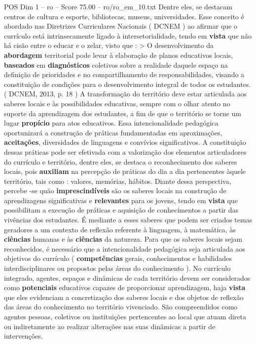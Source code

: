 \begin{textsample}{POS Dim 1 – ro – Score 75.00 – ro/ro\_em\_10.txt}
Dentre eles, se destacam centros de cultura e esporte, bibliotecas, museus, universidades.
Esse conceito é abordado nas Diretrizes Curriculares Nacionais ( DCNEM ) ao afirmar que o currículo está intrinsecamente ligado à intersetorialidade, tendo em \textbf{vista} que não há cisão entre o educar e o zelar, visto que : > O desenvolvimento da \textbf{abordagem} territorial pode levar à elaboração de planos educativos locais, \textbf{baseados} em \textbf{diagnósticos} coletivos sobre a realidade daquele espaço na definição de prioridades e no compartilhamento de responsabilidades, visando a constituição de condições para o desenvolvimento integral de todos os estudantes. ( DCNEM, 2013, p. 18 ) A transformação do território deve estar articulada aos saberes locais e às possibilidades educativas, sempre com o olhar atento no suporte da aprendizagem dos estudantes, a fim de que o território se torne um lugar \textbf{propício} para atos educativos.
Essa intencionalidade pedagógica oportunizará a construção de práticas fundamentadas em aproximações, \textbf{aceitações}, diversidades de linguagens e convívios significativos.
A constituição dessas práticas pode ser efetivada com a valorização dos elementos articuladores do currículo e território, dentre eles, se destaca o reconhecimento dos saberes locais, pois \textbf{auxiliam} na percepção de práticas do dia a dia pertencentes àquele território, tais como : valores, memórias, hábitos.
Diante dessa perspectiva, percebe -se quão \textbf{imprescindíveis} são os saberes locais na construção de aprendizagens significativas e \textbf{relevantes} para os jovens, tendo em \textbf{vista} que possibilitam a execução de práticas e aquisição de conhecimentos a partir das vivências dos estudantes.
É mediante a esses saberes que podem ser criados temas geradores a um contexto de reflexão referente à linguagem, à matemática, às \textbf{ciências} humanas e às \textbf{ciências} da natureza.
Para que os saberes locais sejam reconhecidos, é necessário que a intencionalidade pedagógica seja articulada aos objetivos do currículo ( \textbf{competências} gerais, conhecimentos e habilidades interdisciplinares ou propostos pelas áreas do conhecimento ).
No currículo integrado, agentes, espaços e dinâmicas de cada território devem ser considerados como \textbf{potenciais} educativos capazes de proporcionar aprendizagem, haja \textbf{vista} que eles evidenciam a concretização dos saberes locais e dos objetos de reflexão das áreas do conhecimento no território vivenciado.
São compreendidos como agentes pessoas, coletivos ou instituições pertencentes ao local que atuam direta ou indiretamente ao realizar alterações nas suas dinâmicas a partir de intervenções.

\end{textsample}
